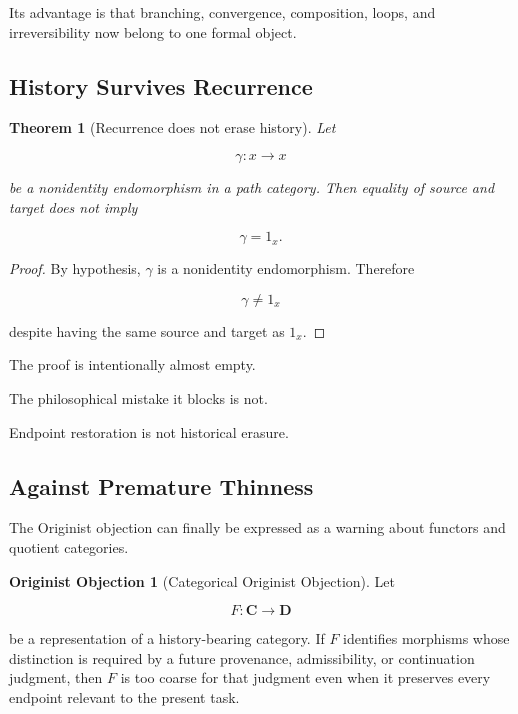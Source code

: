 \documentclass[
  11pt,
  a4paper,
  DIV=12,
  BCOR=0mm,
  parskip=half-
]{scrartcl}
\theoremstyle{definition}
\newtheorem{objection}[definition]{Originist Objection}
\theoremstyle{plain}
\newtheorem{theorem}[definition]{Theorem}
\theoremstyle{remark}
\begin{document}
Its advantage is that branching, convergence, composition, loops, and
irreversibility now belong to one formal object.


\subsection{History Survives Recurrence}
\label{app:irreversibility-corollary}

\begin{theorem}[Recurrence does not erase history]
\label{thm:recurrence-history}
Let

\[
  \gamma:x\to x
\]

be a nonidentity endomorphism in a path category. Then equality of source and
target does not imply

\[
  \gamma=1_x.
\]
\end{theorem}

\begin{proof}
By hypothesis, \(\gamma\) is a nonidentity endomorphism. Therefore

\[
  \gamma\neq1_x
\]

despite having the same source and target as \(1_x\).
\end{proof}

The proof is intentionally almost empty.

The philosophical mistake it blocks is not.

Endpoint restoration is not historical erasure.


\subsection{Against Premature Thinness}
\label{app:categorical-originist-objection}

The Originist objection can finally be expressed as a warning about functors
and quotient categories.

\begin{objection}[Categorical Originist Objection]
Let

\[
  F:\mathbf C\to\mathbf D
\]

be a representation of a history-bearing category. If \(F\) identifies
morphisms whose distinction is required by a future provenance,
admissibility, or continuation judgment, then \(F\) is too coarse for that
judgment even when it preserves every endpoint relevant to the present task.
\end{objection}
\end{document}
